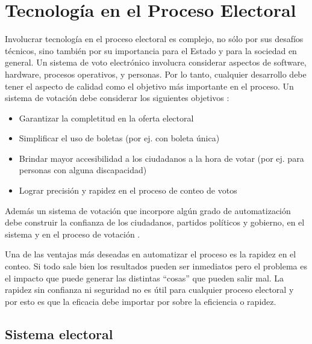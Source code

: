 \chapter{Tecnología en el Proceso Electoral}
\label{SistemaElectoral}

Involucrar tecnología en el proceso electoral es complejo, no sólo por sus desafíos técnicos, sino también por su importancia para el Estado y para la sociedad en general. Un sistema de voto electrónico involucra considerar aspectos de software, hardware, procesos operativos, y personas. Por lo tanto, cualquier desarrollo debe tener el aspecto de calidad como el objetivo más importante en el proceso.\newline
Un sistema de votación debe considerar los siguientes objetivos \cite{conicet}:
\begin{itemize}
    \item Garantizar la completitud en la oferta electoral
    \item Simplificar el uso de boletas (por ej. con boleta única)
    \item Brindar mayor accesibilidad a los ciudadanos a la hora de votar (por ej. para personas con alguna discapacidad)
    \item Lograr precisión y rapidez en el proceso de conteo de votos
\end{itemize}
Además un sistema de votación que incorpore algún grado de automatización debe construir la confianza de los ciudadanos, partidos políticos y gobierno, en el sistema y en el proceso de votación \cite{conicet}.

Una de las ventajas más deseadas en automatizar el proceso es la rapidez en el conteo. Si todo sale bien los resultados pueden ser inmediatos pero el problema es el impacto que puede generar las distintas ``cosas'' que pueden salir mal. La rapidez sin confianza ni seguridad no es útil para cualquier proceso electoral y por esto es que la eficacia debe importar por sobre la eficiencia o rapidez.

\section{Sistema electoral}

